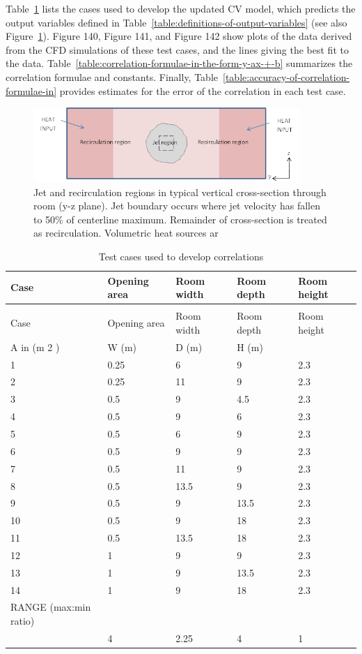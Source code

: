 Table~\ref{table:test-cases-used-to-develop-correlations} lists the cases used to develop the updated CV model, which predicts the output variables defined in Table~\ref{table:definitions-of-output-variables} (see also Figure~\ref{fig:jet-and-recirculation-regions-in-typical}). Figure 140, Figure 141, and Figure 142 show plots of the data derived from the CFD simulations of these test cases, and the lines giving the best fit to the data. Table~\ref{table:correlation-formulae-in-the-form-y-ax-+-b} summarizes the correlation formulae and constants. Finally, Table~\ref{table:accuracy-of-correlation-formulae-in} provides estimates for the error of the correlation in each test case.

\begin{figure}[hbtp] %
\centering
\includegraphics[width=0.9\textwidth, height=0.9\textheight, keepaspectratio=true]{media/image2634.png}
\caption{Jet and recirculation regions in typical vertical cross-section through room (y-z plane). Jet boundary occurs where jet velocity has fallen to 50\% of centerline maximum. Remainder of cross-section is treated as recirculation. Volumetric heat sources ar \protect \label{fig:jet-and-recirculation-regions-in-typical}}
\end{figure}

\begin{longtable}[c]{@{}lllll@{}}
\caption{Test cases used to develop correlations \label{table:test-cases-used-to-develop-correlations}} \tabularnewline
\toprule 
Case & Opening area & Room width & Room depth & Room height \tabularnewline
\midrule
\endfirsthead

\caption[]{Test cases used to develop correlations} \tabularnewline
\toprule 
Case & Opening area & Room width & Room depth & Room height \tabularnewline
\midrule
\endhead

A in (m 2 ) & W (m) & D (m) & H (m) \tabularnewline
1 & 0.25 & 6 & 9 & 2.3 \tabularnewline
2 & 0.25 & 11 & 9 & 2.3 \tabularnewline
3 & 0.5 & 9 & 4.5 & 2.3 \tabularnewline
4 & 0.5 & 9 & 6 & 2.3 \tabularnewline
5 & 0.5 & 6 & 9 & 2.3 \tabularnewline
6 & 0.5 & 9 & 9 & 2.3 \tabularnewline
7 & 0.5 & 11 & 9 & 2.3 \tabularnewline
8 & 0.5 & 13.5 & 9 & 2.3 \tabularnewline
9 & 0.5 & 9 & 13.5 & 2.3 \tabularnewline
10 & 0.5 & 9 & 18 & 2.3 \tabularnewline
11 & 0.5 & 13.5 & 18 & 2.3 \tabularnewline
12 & 1 & 9 & 9 & 2.3 \tabularnewline
13 & 1 & 9 & 13.5 & 2.3 \tabularnewline
14 & 1 & 9 & 18 & 2.3 \tabularnewline
RANGE (max:min ratio) \tabularnewline
 & 4 & 2.25 & 4 & 1 \tabularnewline
\bottomrule
\end{longtable}

